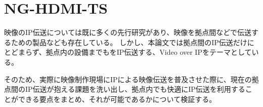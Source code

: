 \chapter{NG-HDMI-TS}
\label{chap:network-transmission}

映像のIP伝送については既に多くの先行研究があり、映像を拠点間などで伝送するための製品なども存在している。
しかし、本論文では拠点間のIP伝送だけにとどまらず、拠点内の設備までもをIP伝送する、Video over IPをテーマとしている。

そのため、実際に映像制作現場にIPによる映像伝送を普及させた際に、現在の拠点間のIP伝送が抱える課題を洗い出し、拠点内でも快適にIP伝送を利用することができる要点をまとめ、それが可能であるかについて検証する。



%
%
%
%
%
%
%
%

